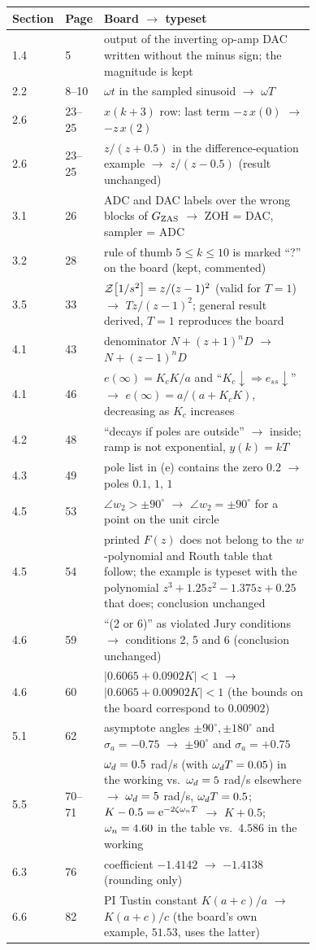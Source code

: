 {\renewcommand{\arraystretch}{1.35}\small
\begin{longtable}{@{}l l p{0.74\linewidth}@{}}
\textbf{Section} & \textbf{Page} & \textbf{Board} $\rightarrow$ \textbf{typeset}\\\hline\endhead
1.4 & 5 & output of the inverting op-amp DAC written without the minus sign; the magnitude is kept\\
2.2 & 8--10 & $\omega t$ in the sampled sinusoid $\to$ $\omega T$\\
2.6 & 23--25 & $x(k+3)$ row: last term $-z\,x(0)$ $\to$ $-z\,x(2)$\\
2.6 & 23--25 & $z/(z+0.5)$ in the difference-equation example $\to$ $z/(z-0.5)$ (result unchanged)\\
3.1 & 26 & ADC and DAC labels over the wrong blocks of $G_{\mathrm{ZAS}}$ $\to$ ZOH = DAC, sampler = ADC\\
3.2 & 28 & rule of thumb $5\le k\le10$ is marked ``?'' on the board (kept, commented)\\
3.5 & 33 & $\mathcal{Z}\!\left[1/s^{2}\right]=z/(z-1)^{2}$ (valid for $T=1$) $\to$ $Tz/(z-1)^{2}$; general result derived, $T=1$ reproduces the board\\
4.1 & 43 & denominator $N+(z+1)^{n}D$ $\to$ $N+(z-1)^{n}D$\\
4.1 & 46 & $e(\infty)=K_cK/a$ and ``$K_c\downarrow\Rightarrow e_{ss}\downarrow$'' $\to$ $e(\infty)=a/(a+K_cK)$, decreasing as $K_c$ increases\\
4.2 & 48 & ``decays if poles are outside'' $\to$ inside; ramp is not exponential, $y(k)=kT$\\
4.3 & 49 & pole list in (e) contains the zero $0.2$ $\to$ poles $0.1,\,1,\,1$\\
4.5 & 53 & $\angle w_2>\pm90^{\circ}$ $\to$ $\angle w_2=\pm90^{\circ}$ for a point on the unit circle\\
4.5 & 54 & printed $F(z)$ does not belong to the $w$-polynomial and Routh table that follow; the example is typeset with the polynomial $z^{3}+1.25z^{2}-1.375z+0.25$ that does; conclusion unchanged\\
4.6 & 59 & ``(2 or 6)'' as violated Jury conditions $\to$ conditions 2, 5 and 6 (conclusion unchanged)\\
4.6 & 60 & $|0.6065+0.0902K|<1$ $\to$ $|0.6065+0.00902K|<1$ (the bounds on the board correspond to $0.00902$)\\
5.1 & 62 & asymptote angles $\pm90^{\circ},\pm180^{\circ}$ and $\sigma_a=-0.75$ $\to$ $\pm90^{\circ}$ and $\sigma_a=+0.75$\\
5.5 & 70--71 & $\omega_d=0.5$ rad/s (with $\omega_d T=0.05$) in the working vs.\ $\omega_d=5$ rad/s elsewhere $\to$ $\omega_d=5$ rad/s, $\omega_d T=0.5$; $K-0.5=\mathrm{e}^{-2\zeta\omega_n T}$ $\to$ $K+0.5$; $\omega_n=4.60$ in the table vs.\ $4.586$ in the working\\
6.3 & 76 & coefficient $-1.4142$ $\to$ $-1.4138$ (rounding only)\\
6.6 & 82 & PI Tustin constant $K(a+c)/a$ $\to$ $K(a+c)/c$ (the board's own example, $51.53$, uses the latter)\\
\end{longtable}}
